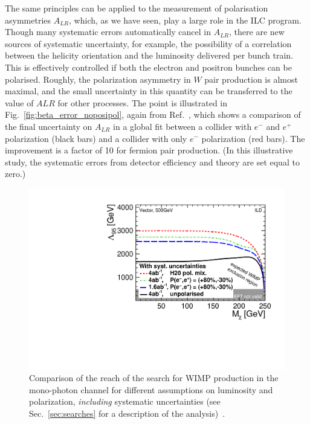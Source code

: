 The same principles can be applied to the measurement of polarisation asymmetries $A_{LR}$, which, as we have seen, play a large role in the ILC program.   Though many systematic 
errors automatically cancel in $A_{LR}$, there are new sources of systematic uncertainty, for example, the possibility of a correlation between the helicity orientation and the luminosity delivered per bunch train.   This is effectively controlled if both the electron and positron 
bunches can be polarised.  Roughly, the polarization asymmetry in $W$ pair production is almost maximal, and the small uncertainty in this quantity can be transferred to the value of $A{LR}$ for other processes. The point is illustrated in Fig.~\ref{fig:beta_error_noposipol}, again from Ref.~\cite{bib:PhDRobert}, which shows a comparison of the final uncertainty on 
$A_{LR}$ in a global fit between a collider with $e^-$ and $e^+$ polarization (black bars) and a collider with only $e^-$ polarization (red bars). The improvement is a factor of 10 for 
fermion pair production.  (In this illustrative study, the systematic errors from detector efficiency and theory are set equal to zero.) 

\begin{figure}
\centering
\includegraphics[width=0.95\linewidth]{./chapters/figures/vector_withSystematics.pdf}
		
\caption{Comparison of the reach of the search for WIMP production in the mono-photon channel for different assumptions on luminosity and polarization, {\em including} systematic uncertainties (see Sec.~\ref{sec:searches} for a description of the analysis)~\cite{Habermehl:417605}. }
\label{fig:polWIMPsys}
\end{figure}


